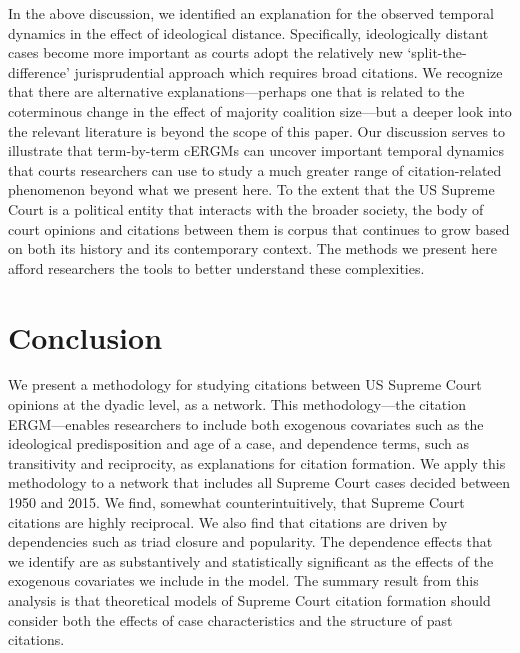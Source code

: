 \documentclass[headsepline=true, abstracton]{scrartcl}
\begin{document}
In the above discussion, we identified an explanation for the observed temporal dynamics in the effect of ideological distance. Specifically, ideologically distant cases become more important as courts adopt the relatively new `split-the-difference' jurisprudential approach which requires broad citations. We recognize that there are alternative explanations---perhaps one that is related to the coterminous change in the effect of majority coalition size---but a deeper look into the relevant literature is beyond the scope of this paper. Our discussion serves to illustrate that term-by-term cERGMs can uncover important temporal dynamics that courts researchers can use to study a much greater range of citation-related phenomenon beyond what we present here. To the extent that the US Supreme Court is a political entity that interacts with the broader society, the body of court opinions and citations between them is corpus that continues to grow based on both its history and its contemporary context. The methods we present here afford researchers the tools to better understand these complexities.






\section{Conclusion}

We present a methodology for studying citations between US Supreme Court opinions at the dyadic level, as a network. This methodology---the citation ERGM---enables researchers to include both exogenous covariates such as the ideological predisposition and age of a case, and dependence terms, such as transitivity and reciprocity, as explanations for citation formation. We apply this methodology to a network that includes all Supreme Court cases decided between 1950 and 2015. We find, somewhat counterintuitively, that Supreme Court citations are highly reciprocal. We also find that citations are driven by dependencies such as triad closure and popularity. The dependence effects that we identify are as substantively and statistically significant as the effects of the exogenous covariates we include in the model. The summary result from this analysis is that theoretical models of Supreme Court citation formation should consider both the effects of case characteristics and the structure of past citations. 
\end{document}
